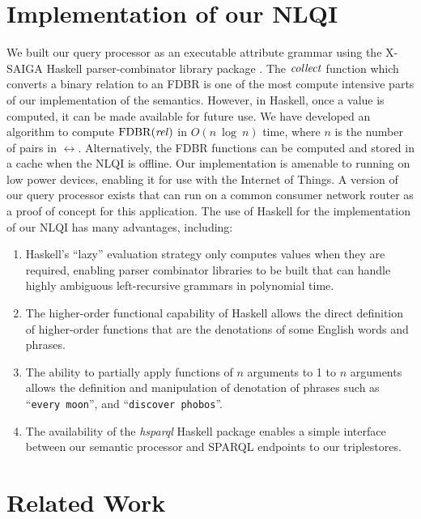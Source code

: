 \documentclass[../main.tex]{subfiles}
\begin{document}
\begin{refsection}
\section{Implementation of our NLQI}
\label{webist2019conf:implementation}
We built our query processor as an executable attribute grammar using the X-SAIGA Haskell parser-combinator library package \cite{frosthafiz2008}.
The $\operatorname{\mathit{collect}}$ function which converts a binary relation to an FDBR is one of the most
compute intensive parts of our implementation of the semantics. However, in Haskell, once a value is
computed, it can be made available for future use. We have developed an algorithm to compute
$\operatorname{FDBR}({\operatorname{\mathit{rel}}})$ in $O(n\ \operatorname{log}\ n)$ time, where $n$ is the number of pairs in $\rel$.
Alternatively, the FDBR functions can be computed and stored in a cache when the NLQI is offline.
Our implementation is amenable to running on low power devices, enabling it for use with the Internet of Things. A version of our query processor exists that can run on a common consumer network router as a proof of concept for this application.
The use of Haskell for the implementation of our NLQI has many advantages, including:

\begin{enumerate}
	\item Haskell's ``lazy'' evaluation strategy only computes values when they are required, enabling parser combinator
	libraries to be built that can handle highly ambiguous left-recursive grammars in polynomial time.
	\item The higher-order functional capability of Haskell allows the direct definition of higher-order
	functions that are the denotations of some English words and phrases.
	\item The ability to partially apply functions of $n$ arguments to 1 to $n$ arguments allows the
	definition and manipulation of denotation of phrases such as ``\texttt{every moon}'', and ``\texttt{discover
	phobos}''.
	\item The availability of the \textit{hsparql} \cite{hsparql} Haskell package enables a simple interface between our semantic processor and SPARQL endpoints to our triplestores.
\end{enumerate}

\section{Related Work}
\label{webist2019conf:relatedwork}


\end{refsection}
\end{document}
